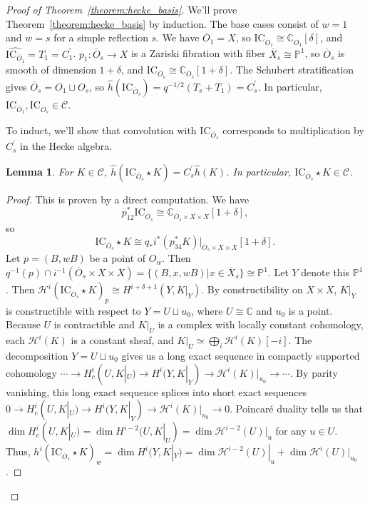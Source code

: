 \documentclass[leqno, openany]{memoir}
\newtheorem{lem}[thm]{Lemma}
\theoremstyle{definition}
\theoremstyle{remark}
\theoremstyle{plain}
\theoremstyle{definition}
\theoremstyle{remark}
\newcommand{\mr}[1]{\mathrm{#1}}
\begin{document}
\begin{proof}[Proof of Theorem~\ref{theorem:hecke_basis}]
We'll prove Theorem~\ref{theorem:hecke_basis} by induction. The base cases consist of $w = 1$ and $w = s$ for a simple reflection $s$. We have $\overline{O}_1 = X$, so $\mr{IC}_{\overline{O}_1} \cong \mathbb{C}_{\overline{O}_1}[\delta]$, and $\widehat{\mr{IC}_{\overline{O}_1}} = T_1 = C_1^{\prime}$. $p_1: \overline{O}_s \to X$ is a Zariski fibration with fiber $\overline{X}_s \cong \mathbb{P}^1$, so $\overline{O}_s$ is smooth of dimension $1 + \delta$, and $\mr{IC}_{\overline{O}_s} \cong \mathbb{C}_{\overline{O}_s}[1 + \delta]$. The Schubert stratification gives $\overline{O}_s = O_1 \sqcup O_s$, so $\widehat{h}(\mr{IC}_{\overline{O}_s}) = q^{-1/2}(T_s + T_1) = C_s^{\prime}$. In particular, $\mr{IC}_{\overline{O}_1},\mr{IC}_{\overline{O}_s} \in \mathcal{C}$.

To induct, we'll show that convolution with $\mr{IC}_{\overline{O}_s}$ corresponds to multiplication by $C_s^{\prime}$ in the Hecke algebra.

\begin{lem}\label{lemma:mult_simp}
For $K \in \mathcal{C}$, $\widehat{h}(\mr{IC}_{\overline{O}_s} \star K) = C_s^{\prime}\widehat{h}(K)$. In particular, $\mr{IC}_{\overline{O}_s} \star K \in \mathcal{C}$.
\end{lem}

\begin{proof}
This is proven by a direct computation. We have $$p_{12}^*\mr{IC}_{\overline{O}_s} \cong \mathbb{C}_{\overline{O}_s \times X \times X}[1 + \delta],$$ so $$\mr{IC}_{\overline{O}_s} \star K \cong q_*i^*(p_{34}^*K)|_{\overline{O}_s \times X \times X}[1 + \delta].$$ Let $p = (B,wB)$ be a point of $O_w$. Then $q^{-1}(p) \cap i^{-1}(\overline{O}_s \times X \times X) = \{(B,x,wB)|x \in \overline{X}_s\} \cong \mathbb{P}^1$. Let $Y$ denote this $\mathbb{P}^1$. Then $\mathcal{H}^i(\mr{IC}_{\overline{O}_s} \star K)_p \cong H^{i + \delta + 1}(Y,K|_Y)$. By constructibility on $X \times X$, $K|_Y$ is constructible with respect to $Y = U \sqcup u_0$, where $U \cong \mathbb{C}$ and $u_0$ is a point. Because $U$ is contractible and $K|_U$ is a complex with locally constant cohomology, each $\mathcal{H}^i(K)$ is a constant sheaf, and $K|_U \simeq \bigoplus_i\mathcal{H}^i(K)[-i]$. The decomposition $Y = U \sqcup u_0$ gives us a long exact sequence in compactly supported cohomology $\cdots \to H_c^i(U,K|_U) \to H^i(Y,K|_Y) \to \mathcal{H}^i(K)|_{u_0} \to \cdots$. By parity vanishing, this long exact sequence splices into short exact sequences $0 \to H_c^i(U,K|_U) \to H^i(Y,K|_Y) \to \mathcal{H}^i(K)|_{u_0} \to 0$. Poincar\'{e} duality tells us that $\dim H_c^i(U,K|_U) = \dim H^{i - 2}(U,K|_U) = \dim\mathcal{H}^{i - 2}(U)|_u$ for any $u \in U$. Thus, $h^i(\mr{IC}_{\overline{O}_s} \star K)_w = \dim H^i(Y,K|_Y) = \dim\mathcal{H}^{i - 2}(U)|_u + \dim\mathcal{H}^i(U)|_{u_0}$.


\end{proof}
\end{proof}
\end{document}
